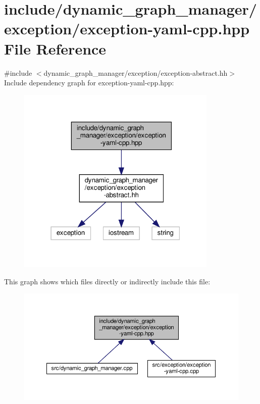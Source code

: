 \hypertarget{exception-yaml-cpp_8hpp}{}\section{include/dynamic\+\_\+graph\+\_\+manager/exception/exception-\/yaml-\/cpp.hpp File Reference}
\label{exception-yaml-cpp_8hpp}
{\ttfamily \#include $<$dynamic\+\_\+graph\+\_\+manager/exception/exception-\/abstract.\+hh$>$}\newline
Include dependency graph for exception-\/yaml-\/cpp.hpp\+:
\nopagebreak
\begin{figure}[H]
\begin{center}
\leavevmode
\includegraphics[width=271pt]{exception-yaml-cpp_8hpp__incl}
\end{center}
\end{figure}
This graph shows which files directly or indirectly include this file\+:
\nopagebreak
\begin{figure}[H]
\begin{center}
\leavevmode
\includegraphics[width=350pt]{exception-yaml-cpp_8hpp__dep__incl}
\end{center}
\end{figure}
